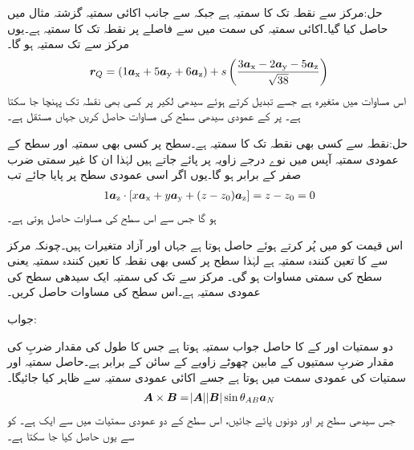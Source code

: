 حل:مرکز  سے  نقطہ  تک کا سمتیہ  ہے جبکہ  سے  جانب اکائی سمتیہ  گزشتہ مثال میں حاصل کیا گیا۔اکائی سمتیہ  کی سمت میں   سے  فاصلے پر نقطہ  تک کا سمتیہ  ہے۔یوں مرکز سے   تک سمتیہ  ہو گا۔
\begin{align*}
{\ensuremath{{\boldsymbol{r}}}}_Q=(1{\boldsymbol{a}}_{\textup{x}}+5{\boldsymbol{a}}_{\textup{y}}+6{\boldsymbol{a}}_{\textup{z}}) +s \left(\frac{3{\boldsymbol{a}}_{\textup{x}}-2{\boldsymbol{a}}_{\textup{y}}-5{\boldsymbol{a}}_{\textup{z}}}{\sqrt{38}}\right)
\end{align*}
اس مساوات میں  متغیرہ ہے جسے تبدیل کرتے ہوئے سیدھی لکیر پر کسی بھی نقطہ  تک پہنچا جا سکتا ہے۔
 پر  کے عمودی سیدھی سطح کی مساوات حاصل کریں جہاں  مستقل ہے۔

حل:نقطہ  سے کسی بھی نقطہ  تک کا سمتیہ  ہے۔سطح پر کسی بھی سمتیہ اور سطح کے عمودی سمتیہ آپس میں نوے درجے زاویہ پر پائے جاتے ہیں لہٰذا ان کا غیر سمتی ضرب صفر کے برابر ہو گا۔یوں اگر  اسی عمودی سطح پر پایا جائے تب
\begin{align*}
1{\boldsymbol{a}}_{\textup{z}} \cdot [x{\boldsymbol{a}}_{\textup{x}}+y{\boldsymbol{a}}_{\textup{y}}+(z-z_0){\boldsymbol{a}}_{\textup{z}}]=z-z_0=0
\end{align*}
ہو گا جس سے اس سطح کی مساوات  حاصل ہوتی ہے۔

اس قیمت کو  میں پُر کرتے ہوئے  حاصل ہوتا ہے جہاں  اور  آزاد متغیرات ہیں۔چونکہ مرکز سے  کا تعین کنندہ سمتیہ  ہے لہٰذا  سطح پر کسی بھی نقطہ  کا تعین کنندہ سمتیہ یعنی سطح کی سمتی مساوات   ہو گی۔
مرکز سے  تک کی سمتیہ ایک سیدھی سطح کی عمودی سمتیہ ہے۔اس سطح کی  مساوات حاصل کریں۔

جواب:

دو سمتیات  اور  کے  کا حاصل جواب سمتیہ ہوتا ہے جس کا طول  کی مقدار ضربِ   کی مقدار ضربِ سمتیوں کے مابین چھوٹے زاویے کے سائن کے برابر ہے۔حاصل سمتیہ  اور  سمتیات کی عمودی سمت  میں ہوتا ہے جسے اکائی عمودی سمتیہ  سے ظاہر کیا جائیگا۔
\begin{align}\label{مساوات_سمتیہ_سمتی_ضرب}
{\ensuremath{{\boldsymbol{A}}}} \times {\ensuremath{{\boldsymbol{B}}}}=\abs{{{\boldsymbol{A}}}} \abs{{{\boldsymbol{B}}}} \sin \theta_{AB} {{\boldsymbol{a}}}_N
\end{align}
جس سیدھی سطح پر  اور  دونوں پائے جائیں،  اس سطح کے دو عمودی سمتیات میں سے ایک ہے۔ کو  سے یوں حاصل کیا جا سکتا ہے۔

